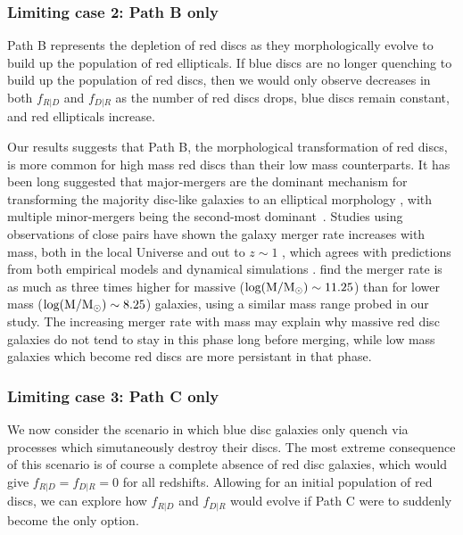 \documentclass[useAMS,usenatbib]{mn2e}
\begin{document}
\subsubsection{Limiting case 2: Path B only}

Path B represents the depletion of red discs as they morphologically evolve to build up the population of red ellipticals. If blue discs are no longer quenching to build up the population of red discs, then we would only observe decreases in both $f_{R|D}$ and $f_{D|R}$ as the number of red discs drops, blue discs remain constant, and red ellipticals increase. 

Our results suggests that Path B, the morphological transformation of red discs, is more common for high mass red discs than their low mass counterparts. It has been long suggested that major-mergers are the dominant mechanism for transforming the majority disc-like galaxies to an elliptical morphology \citep{Toomre1977,Schweizer1982,Schweizer1990}, with multiple minor-mergers being the second-most dominant~\citep{Bundy2009,Hopkins2010b}. Studies using observations of close pairs have shown the galaxy merger rate increases with mass, both in the local Universe \citep{Xu2004,Patton2008,Domingue2009,Robotham2014,Casteels2014} and out to $z\sim1$ \citep{Xu2012,Bundy2009}, which agrees with predictions from both empirical models and dynamical simulations \citep{Hopkins2010a,Hopkins2010b,Maller2006}. \citet{Casteels2014} find the merger rate is as much as three times higher for massive ($\rm log(M/M_{\odot})\sim11.25$) than for lower mass ($\rm log(M/M_{\odot})\sim8.25$) galaxies, using a similar mass range probed in our study. The increasing merger rate with mass may explain why massive red disc galaxies do not tend to stay in this phase long before merging, while low mass galaxies which become red discs are more persistant in that phase. 
 

\subsubsection{Limiting case 3: Path C only}
We now consider the scenario in which blue disc galaxies only quench via processes which simutaneously destroy their discs. The most extreme consequence of this scenario is of course a complete absence of red disc galaxies, which would give $f_{R|D}=f_{D|R}=0$ for all redshifts. Allowing for an initial population of red discs, we can explore how $f_{R|D}$ and $f_{D|R}$ would evolve if Path C were to suddenly become the only option. 
\end{document}
